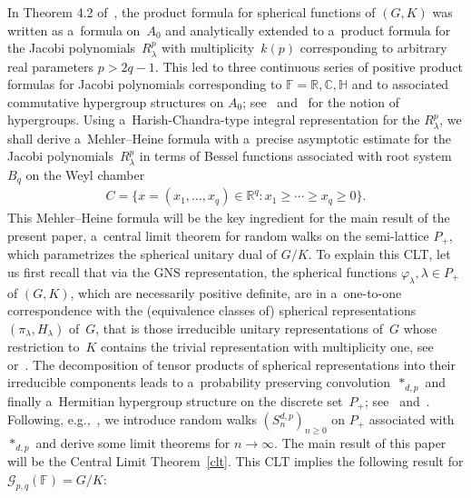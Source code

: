 \documentclass[pdftex]{sigma}
\numberwithin{equation}{section}
\begin{document}
In Theorem 4.2 of~\cite{RR}, the product formula for spherical functions of $(G,K)$ was written as a~formula on~$A_0$
and analytically extended to a~product formula for the Jacobi polyno\-mials~$R_\lambda^p$ with multiplicity~$k(p)$
corresponding to arbitrary real parameters $p>2q-1$.
This led to three continuous series of positive product formulas for Jacobi polynomials corresponding to $\mathbb
F=\mathbb R, \mathbb C, \mathbb H$ and to associated commutative hypergroup structures on $A_0$; see~\cite{J}
and~\cite{BH} for the notion of hypergroups.
Using a~Harish-Chandra-type integral representation for the $R_\lambda^p$, we shall derive a~Mehler--Heine formula with
a~precise asymptotic estimate for the Jacobi polyno\-mials~$R_{\lambda}^p$ in terms of Bessel functions associated with
root system $B_q$ on the Weyl chamber
\begin{gather*}
C=\{x= (x_1, \ldots, x_q) \in \mathbb R^q: x_1 \geq \cdots \geq x_q \geq 0\}.
\end{gather*}
This Mehler--Heine formula will be the key ingredient for the main result of the present paper, a~central limit theorem
for random walks on the semi-lattice $P_+$, which parametrizes the spherical unitary dual of $G/K$.
To explain this CLT, let us f\/irst recall that via the GNS representation, the spherical functions $\varphi_\lambda,
\lambda \in P_+$ of $(G,K)$, which are necessarily positive def\/inite, are in a~one-to-one correspondence with the
(equivalence classes of) spherical representations $(\pi_\lambda,H_\lambda)$ of~$G$, that is those irreducible unitary
representations of~$G$ whose restriction to~$K$ contains the trivial representation with multiplicity one, see~\cite{F}
or~\cite[Chapter~IV]{Hel}.
The decomposition of tensor products of spherical representations into their irreducible components leads to
a~probability preserving convolution~$*_{d,p}$ and f\/inally a~Hermitian hypergroup structure on the discrete set~$P_+$;
see~\cite{Du} and~\cite{K3}.
Following, e.g.,~\cite{BH,V1,Z}, we introduce random walks $(S_n^{d,p})_{n\ge0}$ on $P_+$ associated
with $*_{d,p}$ and derive some limit theorems for $n\to\infty$.
The main result of this paper will be the Central Limit Theorem~\ref{clt}.
This CLT implies the following result for $\mathcal G_{p,q}(\mathbb F)=G/K$:
\end{document}
